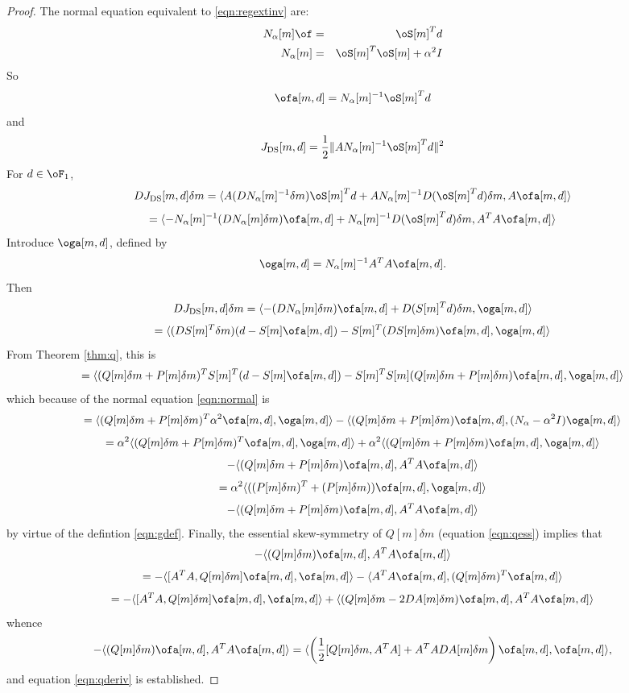 \begin{proof}
The normal equation equivalent to \ref{eqn:regextinv} are:
\begin{eqnarray}
\label{eqn:normal}
N_{\alpha}[m]\of &=& \oS[m]^Td\nonumber\\
N_{\alpha}[m] & = & \oS[m]^T\oS[m] + \alpha^2 I
\end{eqnarray}
So
\begin{equation}
\label{eqn:ofanorm}
\ofa[m,d] = N_{\alpha}[m]^{-1}\oS[m]^Td
\end{equation}
and 
\[
J_{\rm DS}[m,d] = \frac{1}{2}\|A N_{\alpha}[m]^{-1}\oS[m]^Td\|^2
\]
For $d \in \oF_1$,
\[
DJ_{\rm DS}[m,d] \delta m = \langle A (DN_{\alpha}[m]^{-1}\delta m)
\oS[m]^Td + AN_{\alpha}[m]^{-1}D(\oS[m]^Td)\delta m,A\ofa[m,d]\rangle
\]
\[
=\langle - N_{\alpha}[m]^{-1}(DN_{\alpha}[m]\delta m)\ofa[m,d]
  +N_{\alpha}[m]^{-1}D(\oS[m]^Td)\delta m,A^TA\ofa[m,d]\rangle
\]
Introduce $\oga[m,d]$, defined by
\begin{equation}
\label{eqn:gdef}
\oga[m,d] = N_{\alpha}[m]^{-1}A^TA\ofa[m,d].
\end{equation}
Then
\[
DJ_{\rm DS}[m,d] \delta m = \langle - (DN_{\alpha}[m]\delta m)\ofa[m,d] +
  D(S[m]^Td)\delta m, \oga[m,d]\rangle
\]
\begin{equation}
\label{eqn:pregrad1}
= \langle (DS[m]^T\delta m)(d-S[m]\ofa[m,d]) - S[m]^T (DS[m]\delta m)\ofa[m,d],\oga[m,d]\rangle
\end{equation}
From Theorem \ref{thm:q}, this is
\[
=\langle (Q[m]\delta m + P[m]\delta m)^TS[m]^T(d-S[m]
\ofa[m,d]) - S[m]^TS[m]
(Q[m]\delta m + P[m]\delta m)\ofa[m,d],\oga[m,d]\rangle
\]
which because of the normal equation \ref{eqn:normal} is
\[
= \langle (Q[m]\delta m + P[m]\delta m)^T\alpha^2\ofa[m,d],\oga[m,d]\rangle 
-\langle (Q[m]\delta m + P[m]\delta m)\ofa[m,d], (N_{\alpha} -
\alpha^2I)\oga[m,d]\rangle
\]
\[
= \alpha^2 \langle (Q[m]\delta m + P[m]\delta
m)^T\ofa[m,d],\oga[m,d]\rangle 
+ \alpha^2 \langle (Q[m]\delta m + P[m]\delta
m)\ofa[m,d],\oga[m,d]\rangle
\]
\[
-\langle (Q[m]\delta m + P[m]\delta
m)\ofa[m,d],A^TA\ofa[m,d]\rangle
\]
\[
=\alpha^2 \langle ((P[m]\delta m)^T +(P[m]\delta
m))\ofa[m,d],\oga[m,d]\rangle 
\]
\[
-\langle (Q[m]\delta m + P[m]\delta
m)\ofa[m,d],A^TA\ofa[m,d]\rangle
\]
by virtue of the defintion \ref{eqn:gdef}. Finally, the essential skew-symmetry of
$Q[m]\delta m$ (equation \ref{eqn:qess}) implies that
\[
-\langle (Q[m]\delta m)\ofa[m,d],A^TA\ofa[m,d]\rangle
\]
\[
=-\langle [A^TA,Q[m]\delta m]\ofa[m,d],\ofa[m,d]\rangle- \langle A^TA
\ofa[m,d],(Q[m]\delta m)^T\ofa[m,d]\rangle
\]
\[
=-\langle [A^TA,Q[m]\delta m]\ofa[m,d],\ofa[m,d]\rangle +\langle
(Q[m]\delta m - 2DA[m]\delta m)\ofa[m,d],A^TA\ofa[m,d]\rangle
\]
whence
\begin{equation}
\label{eqn:qcomm}
-\langle (Q[m]\delta m)\ofa[m,d],A^TA\ofa[m,d]\rangle =
\langle\left(\frac{1}{2} [Q[m]\delta m,A^TA] + A^TA DA[m]\delta m\right)\ofa[m,d],\ofa[m,d]\rangle,
\end{equation}
and equation \ref{eqn:qderiv} is established.


\end{proof}
